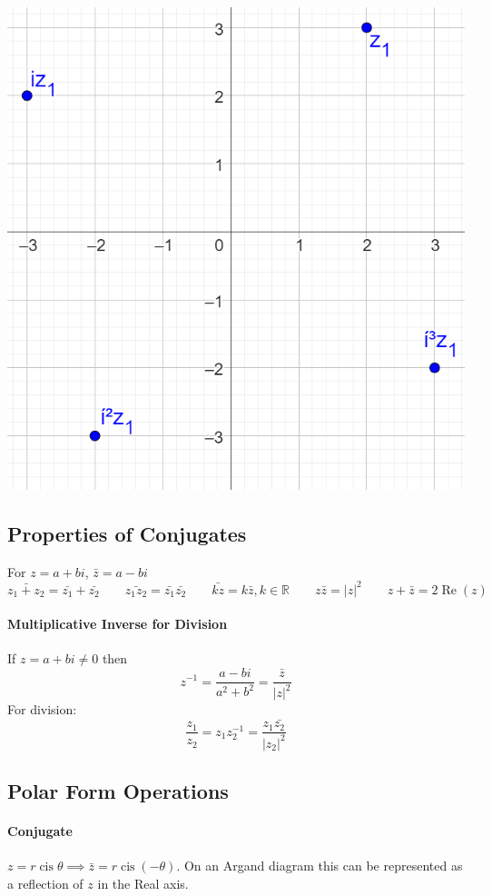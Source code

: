 \documentclass[a4paper,twoside]{article}
\DeclareMathOperator\cis{cis}
\DeclareMathOperator\Real{Re}
\begin{document}
			\begin{minipage}{0.5\textwidth}
				\includegraphics[width=\linewidth]{argandrotate.png}
			\end{minipage}
		\subsection{Properties of Conjugates}
			For $z=a+bi$, $\bar{z}=a-bi$
			\[
				\bar{z_1+z_2}=\bar{z_1}+\bar{z_2} \qquad \bar{z_1z_2}=\bar{z_1}\bar{z_2} \qquad \bar{kz}=k\bar{z},k\in\mathbb{R} \qquad z\bar{z}=|z|^2 \qquad z+\bar{z}=2\Real(z)
			\]
			\paragraph{Multiplicative Inverse for Division} If $z=a+bi\neq0$ then
			\[
				z^{-1}=\frac{a-bi}{a^2+b^2}=\frac{\bar{z}}{|z|^2}
			\]
			For division:
			\[
				\frac{z_1}{z_2}=z_1z_2^{-1}=\frac{z_1\bar{z_2}}{|z_2|^2}
			\]
		\subsection{Polar Form Operations}
			\paragraph{Conjugate} $z=r\cis\theta\implies\bar{z}=r\cis\left(-\theta\right)$. On an Argand diagram this can be represented as a reflection of $z$ in the Real axis.
\end{document}
